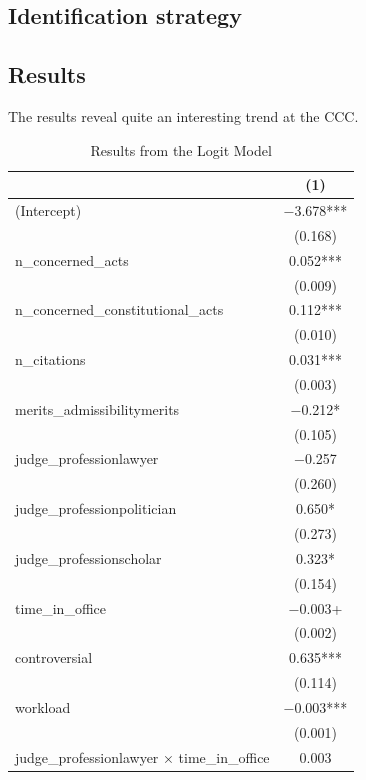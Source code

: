 \documentclass[
  11pt,
]{article}
\begin{document}
\hypertarget{identification-strategy}{%
\subsection{Identification strategy}\label{identification-strategy}}

\hypertarget{results}{%
\subsection{Results}\label{results}}

The results reveal quite an interesting trend at the CCC.

\begin{table}

\caption{\label{tab:unnamed-chunk-6}Results from the Logit Model}
\centering
\begin{tabular}[t]{lc}
\toprule
  & (1)\\
\midrule
(Intercept) & \num{-3.678}***\\
 & (\num{0.168})\\
n\_concerned\_acts & \num{0.052}***\\
 & (\num{0.009})\\
n\_concerned\_constitutional\_acts & \num{0.112}***\\
 & (\num{0.010})\\
n\_citations & \num{0.031}***\\
 & (\num{0.003})\\
merits\_admissibilitymerits & \num{-0.212}*\\
 & (\num{0.105})\\
judge\_professionlawyer & \num{-0.257}\\
 & (\num{0.260})\\
judge\_professionpolitician & \num{0.650}*\\
 & (\num{0.273})\\
judge\_professionscholar & \num{0.323}*\\
 & (\num{0.154})\\
time\_in\_office & \num{-0.003}+\\
 & \vphantom{1} (\num{0.002})\\
controversial & \num{0.635}***\\
 & (\num{0.114})\\
workload & \num{-0.003}***\\
 & (\num{0.001})\\
judge\_professionlawyer × time\_in\_office & \num{0.003}\\

\end{tabular}
\end{table}
\end{document}
